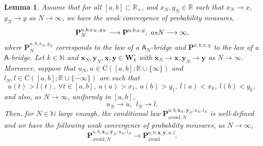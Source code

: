 \documentclass[10pt,a4paper]{amsart}
\newtheorem{lem}{Lemma}
\begin{document}
\begin{lem}\label{Lem-CondDistConv}
Assume that for all $[a,b] \subset \mathbb{R}_+$, and $x_N,y_N \in \mathbb{R}$ such that $x_N \to x$, $y_N \to y$ as $N \to \infty$, we have the weak convergence of probability measures,
\begin{equation}\label{SingleBridgeConv}
\mathbf{P}_N^{a,b;x_N,y_N} \longrightarrow \mathbf{P}^{a,b;x,y}, \ \textnormal{ as } N \longrightarrow \infty,
\end{equation}
where $\mathbf{P}_N^{a,b;x_N,y_N}$ corresponds to the law of a $\mathsf{A}_N$-bridge and $\mathbf{P}^{a,b;x,y}$ to the law of a $\mathsf{A}$-bridge.  Let $k\in \mathbb{N}$ and $\mathbf{x}_N,\mathbf{y}_N, \mathbf{x},\mathbf{y}\in \mathbf{W}_{k}^\circ$ with $\mathbf{x}_N \to \mathbf{x}, \mathbf{y}_N \to \mathbf{y}$ as $N \to \infty$. Moreover, suppose that $u_N,u \in \mathrm{C}([a,b];\mathbb{R}\cup \{ \infty \})$ and $l_N,l \in \mathrm{C}([a,b];\mathbb{R}\cup \{ -\infty \})$ are such that 
\begin{equation*}
u(t)>l(t), \ \forall t \in [a,b], \ u(a)>x_1, \ u(b)>y_1, \ l(a)<x_k, \ l(b)<y_k,
\end{equation*}
and also, as $N \to \infty$, uniformly in $[a,b]$,
\begin{equation}\label{BoundaryConvergence}
u_N \longrightarrow u, \ \ l_N \longrightarrow l.
\end{equation}
Then, for $N \in \mathbb{N}$ large enough, the conditional law $\mathbf{P}_{\mathrm{avoid};N}^{a,b;\mathbf{x}_N,\mathbf{y}_N;u_N,l_N}$ is well-defined and we have the following weak convergence of probability measures, as $N \longrightarrow \infty$,
\begin{equation}\label{ConditionedBridgeConv}
\mathbf{P}_{\mathrm{avoid};N}^{a,b;\mathbf{x}_N,\mathbf{y}_N;u_N,l_N}\longrightarrow \mathbf{P}_{\mathrm{avoid}}^{a,b;\mathbf{x},\mathbf{y};u,l}.
\end{equation}
\end{lem}
\end{document}

